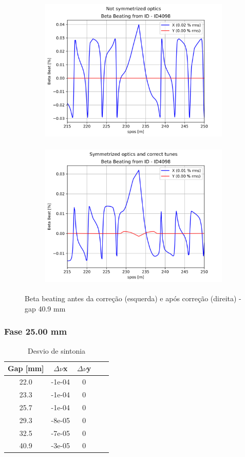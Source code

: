 \documentclass[a4paper,12pt]{article}
\begin{document}
\begin{figure}[H]
\begin{subfigure}{0.5\textwidth}
\includegraphics[width=0.9\linewidth, height=7cm]{figs/phase-25 gap40 uncorrected-optics.png} 
\label{fig:subim1-2540}
\end{subfigure}
\begin{subfigure}{0.5\textwidth}
\includegraphics[width=0.9\linewidth, height=7cm]{figs/phase-25 gap40 corrected-optics-tunes.png}
\label{fig:subim2-2540}
\end{subfigure}
\caption{Beta beating antes da correção (esquerda) e após correção (direita) - gap 40.9 mm}
\label{fig:bb-25_40}
\end{figure}


\subsubsection{Fase 25.00 mm}

\begin{table}[H]
\centering
\caption{Desvio de sintonia}
\begin{tabular}{|c|c|c|c|c|}
\hline
Gap {[}mm{]} & $\Delta \nu$x & $\Delta \nu$y\\ \hline
22.0 & -1e-04 & 0\\ \hline
23.3 & -1e-04 & 0\\ \hline
25.7 & -1e-04 & 0\\ \hline
29.3 & -8e-05 & 0\\ \hline
32.5 & -7e-05 & 0\\ \hline
40.9 & -3e-05 & 0\\ \hline
\end{tabular}
\label{tab:coropt25}
\end{table}
\end{document}
